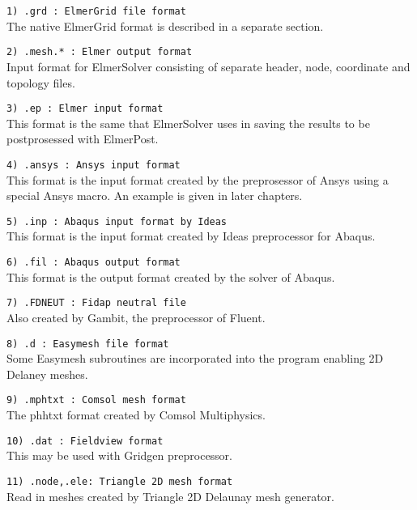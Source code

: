 \begin{description}
\item \texttt{1)  .grd      : ElmerGrid file format} \\
The native ElmerGrid format is  described in a separate section.

\item \texttt{2)  .mesh.*  : Elmer output format} \\
Input format for ElmerSolver consisting of separate header,
node, coordinate and topology files.

\item \texttt{3)  .ep      : Elmer input format} \\
This format is the same that
ElmerSolver uses in saving the results to be 
postprosessed with ElmerPost. 

\item \texttt{4)  .ansys    : Ansys input format} \\
This format is the input format 
created by the preprosessor of Ansys using a special
Ansys macro.
An example is given in later chapters.

\item \texttt{5)  .inp    : Abaqus input format by Ideas} \\
This format is the input format 
created by Ideas preprocessor for Abaqus.

\item \texttt{6)  .fil    : Abaqus output format} \\
This format is the output format 
created by the solver of Abaqus.

\item \texttt{7)  .FDNEUT  : Fidap neutral file} \\
Also created by Gambit, the preprocessor of Fluent.

\item \texttt{8) .d : Easymesh file format} \\
Some Easymesh subroutines are incorporated into 
the program enabling 2D Delaney meshes.

\item \texttt{9)  .mphtxt   : Comsol mesh format} \\
The phhtxt format created by Comsol Multiphysics. 

\item \texttt{10)  .dat      : Fieldview format} \\
This may be used with Gridgen preprocessor.

\item \texttt{11) .node,.ele: Triangle 2D mesh format} \\
Read in meshes created by Triangle 2D Delaunay mesh generator.


\end{description}
